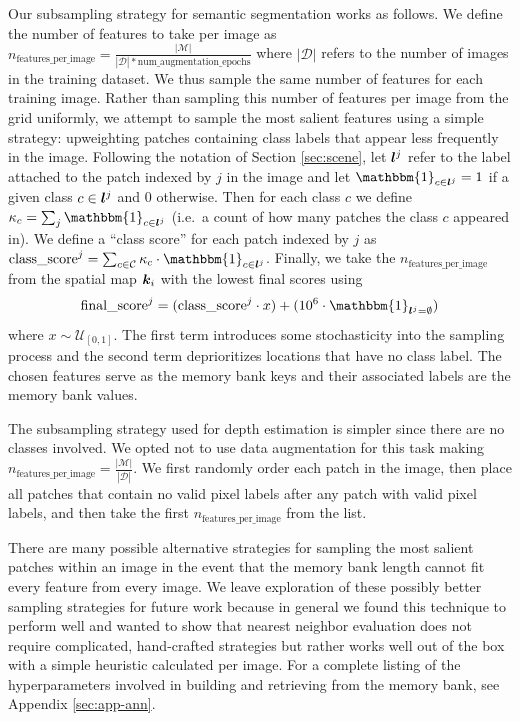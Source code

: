 \documentclass{article}
\begin{document}
Our subsampling strategy for semantic segmentation works as follows. We define the number of features to take per image as \(n_{\text{features\_per\_image}} = \frac{|\mathcal{M}|}{|\mathcal{D}| * \text{num\_augmentation\_epochs}}\) where \(|\mathcal{D}|\) refers to the number of images in the training dataset. We thus sample the same number of features for each training image. Rather than sampling this number of features per image from the grid uniformly, we attempt to sample the most salient features using a simple strategy: upweighting patches containing class labels that appear less frequently in the image. Following the notation of Section \ref{sec:scene}, let \({\bm{l}}^j\) refer to the label attached to the patch indexed by \(j\) in the image and let \(\mathbbm{1}_{c \in \vl^j} = 1\) if a given class \(c \in {\bm{l}}^j\) and \(0\) otherwise. Then for each class \(c\) we define \(\kappa_{c} = \sum_{j} \mathbbm{1}_{c \in \vl^j}\) (i.e.\ a count of how many patches the class \(c\) appeared in). We define a ``class score'' for each patch indexed by \(j\) as \(\text{class\_score}^{j} = \sum_{c \in \mathcal{C}} \kappa_{c} \cdot \mathbbm{1}_{c \in \vl^j}\). Finally, we take the \(n_{\text{features\_per\_image}}\) from the spatial map \({\bm{k}}_i\) with the lowest final scores using
\begin{equation}
\text{final\_score}^{j} = (\text{class\_score}^{j} \cdot x) + (10^6 \cdot \mathbbm{1}_{\vl^j = \emptyset})
\end{equation} where \(x \sim \mathcal{U}_{[0, 1]}\). The first term introduces some stochasticity into the sampling process and the second term deprioritizes locations that have no class label. The chosen features serve as the memory bank keys and their associated labels are the memory bank values.

The subsampling strategy used for depth estimation is simpler since there are no classes involved. We opted not to use data augmentation for this task making \(n_{\text{features\_per\_image}} = \frac{|\mathcal{M}|}{|\mathcal{D}|}\). We first randomly order each patch in the image, then place all patches that contain no valid pixel labels after any patch with valid pixel labels, and then take the first \(n_{\text{features\_per\_image}}\) from the list.

There are many possible alternative strategies for sampling the most salient patches within an image in the event that the memory bank length cannot fit every feature from every image. We leave exploration of these possibly better sampling strategies for future work because in general we found this technique to perform well and wanted to show that nearest neighbor evaluation does not require complicated, hand-crafted strategies but rather works well out of the box with a simple heuristic calculated per image. For a complete listing of the hyperparameters involved in building and retrieving from the memory bank, see Appendix \ref{sec:app-ann}.
\end{document}
